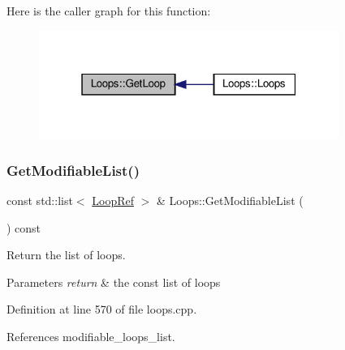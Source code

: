 Here is the caller graph for this function\+:
\nopagebreak
\begin{figure}[H]
\begin{center}
\leavevmode
\includegraphics[width=277pt]{d3/ded/classLoops_ae1017c5d90fca5a7717adf98d5b73712_icgraph}
\end{center}
\end{figure}
\mbox{\label{classLoops_a6376c9fcfe6f046d1d8aa30570076eb2}} 
\subsubsection{\texorpdfstring{Get\+Modifiable\+List()}{GetModifiableList()}}
{\footnotesize\ttfamily const std\+::list$<$ \hyperlink{loop_8hpp_aa4a60313089619376f67557c4120423c}{Loop\+Ref} $>$ \& Loops\+::\+Get\+Modifiable\+List (\begin{DoxyParamCaption}{ }\end{DoxyParamCaption}) const}



Return the list of loops. 


\begin{DoxyParams}{Parameters}
{\em return} & the const list of loops \\
\hline
\end{DoxyParams}


Definition at line 570 of file loops.\+cpp.



References modifiable\+\_\+loops\+\_\+list.

\mbox{\label{classLoops_ac022f2714ff16a787ea9e609616e7f9d}} 
